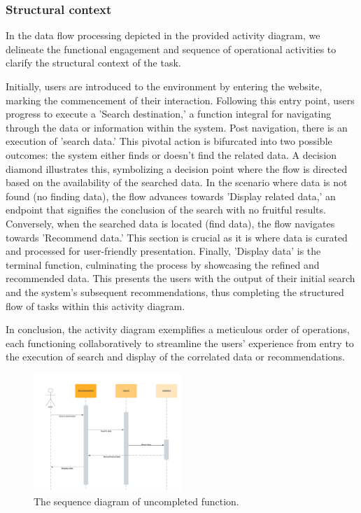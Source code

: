 \documentclass[conference]{IEEEtran}
\begin{document}
\subsubsection{\textbf{Structural context }}

In the data flow processing depicted in the provided activity diagram, we delineate the functional engagement and sequence of operational activities to clarify the structural context of the task.

Initially, users are introduced to the environment by entering the website, marking the commencement of their interaction. Following this entry point, users progress to execute a 'Search destination,' a function integral for navigating through the data or information within the system. Post navigation, there is an execution of 'search data.' This pivotal action is bifurcated into two possible outcomes: the system either finds or doesn't find the related data. A decision diamond illustrates this, symbolizing a decision point where the flow is directed based on the availability of the searched data. In the scenario where data is not found (no finding data), the flow advances towards 'Display related data,' an endpoint that signifies the conclusion of the search with no fruitful results. Conversely, when the searched data is located (find data), the flow navigates towards 'Recommend data.' This section is crucial as it is where data is curated and processed for user-friendly presentation. Finally, 'Display data' is the terminal function, culminating the process by showcasing the refined and recommended data. This presents the users with the output of their initial search and the system's subsequent recommendations, thus completing the structured flow of tasks within this activity diagram.

In conclusion, the activity diagram exemplifies a meticulous order of operations, each functioning collaboratively to streamline the users' experience from entry to the execution of search and display of the correlated data or recommendations.

\begin{figure}[htbp]
	\centerline{\includegraphics[width=0.5\textwidth]{uncompleted/sequence_uncompleted.pdf}}
	\caption{The sequence diagram of uncompleted function. }
	\label{uncompleted3}
\end{figure}
\end{document}
